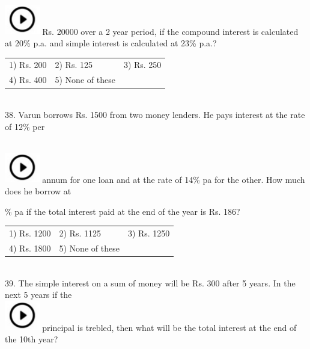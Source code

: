 \documentclass{article}
\begin{document}
	\noindent 
	
	\noindent  
\noindent \\ \includegraphics*[width=0.60in, height=0.52in]{images/image1} Rs. 20000 over a 2 year period, if the compound interest is calculated at 20\% p.a. and simple interest is calculated at 23\% p.a.?
	
	\noindent 
	
	\noindent \begin{tabular}{p{1.7in} p{1.6in} p{1.6in}} \\ 
 1) Rs. 200                   &  2) Rs. 125         &  3) Rs. 250       \\
4) Rs. 400     & 5) None of these  \\
\end{tabular}
	
	\noindent 
	
	\noindent \\  38. Varun borrows Rs. 1500 from two money lenders. He pays interest at the rate of 12\% per
	
	\noindent  
\noindent \\ \includegraphics*[width=0.60in, height=0.52in]{images/image1} annum for one loan and at the rate of 14\% pa for the other. How much does he borrow at
	
	\% pa if the total interest paid at the end of the year is Rs. 186?
	
	\noindent 
	
	\noindent \begin{tabular}{p{1.7in} p{1.6in} p{1.6in}} \\ 
 1) Rs. 1200                 &  2) Rs. 1125          &  3) Rs. 1250          \\
4) Rs. 1800          & 5) None of these  \\
\end{tabular}
	
	\noindent  \\ 
	
	39. The simple interest on a sum of money will be Rs. 300 after 5 years. In the next 5 years if the  
\noindent \\ \includegraphics*[width=0.60in, height=0.52in]{images/image1} principal is trebled, then what will be the total interest at the end of the 10th year?
	
\end{document}
